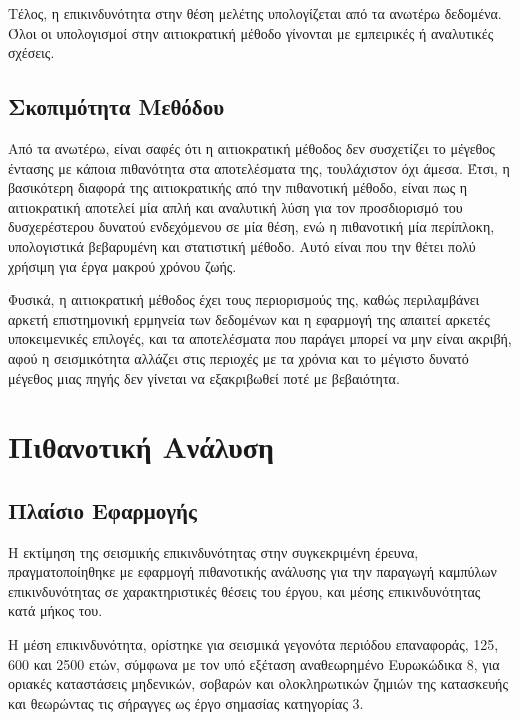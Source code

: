 Τέλος, η επικινδυνότητα στην θέση μελέτης υπολογίζεται από τα ανωτέρω δεδομένα. Όλοι οι υπολογισμοί στην αιτιοκρατική μέθοδο γίνονται με εμπειρικές ή αναλυτικές σχέσεις.

\subsection{Σκοπιμότητα Μεθόδου}
Από τα ανωτέρω, είναι σαφές ότι η αιτιοκρατική μέθοδος δεν συσχετίζει το μέγεθος έντασης με κάποια πιθανότητα στα αποτελέσματα της, τουλάχιστον όχι άμεσα. Έτσι, η βασικότερη διαφορά της αιτιοκρατικής από την πιθανοτική μέθοδο, είναι πως η αιτιοκρατική αποτελεί μία απλή και αναλυτική λύση για τον προσδιορισμό του δυσχερέστερου δυνατού ενδεχόμενου σε μία θέση, ενώ η πιθανοτική μία περίπλοκη, υπολογιστικά βεβαρυμένη και στατιστική μέθοδο. Αυτό είναι που την θέτει πολύ χρήσιμη για έργα μακρού χρόνου ζωής.

Φυσικά, η αιτιοκρατική μέθοδος έχει τους περιορισμούς της, καθώς περιλαμβάνει αρκετή επιστημονική ερμηνεία των δεδομένων και η εφαρμογή της απαιτεί αρκετές υποκειμενικές επιλογές, και τα αποτελέσματα που παράγει μπορεί να μην είναι ακριβή, αφού η σεισμικότητα αλλάζει στις περιοχές με τα χρόνια και το μέγιστο δυνατό μέγεθος μιας πηγής δεν γίνεται να εξακριβωθεί ποτέ με βεβαιότητα.


\section{Πιθανοτική Ανάλυση}
\subsection{Πλαίσιο Εφαρμογής}
Η εκτίμηση της σεισμικής επικινδυνότητας στην συγκεκριμένη έρευνα, πραγματοποίηθηκε με εφαρμογή πιθανοτικής ανάλυσης για την παραγωγή καμπύλων επικινδυνότητας σε χαρακτηριστικές θέσεις του έργου, και μέσης επικινδυνότητας κατά μήκος του.

Η μέση επικινδυνότητα, ορίστηκε για σεισμικά γεγονότα περιόδου επαναφοράς, 125, 600 και 2500 ετών, σύμφωνα με τον υπό εξέταση αναθεωρημένο Ευρωκώδικα 8, για οριακές καταστάσεις μηδενικών, σοβαρών και ολοκληρωτικών ζημιών της κατασκευής και θεωρώντας τις σήραγγες ως έργο σημασίας κατηγορίας 3.

